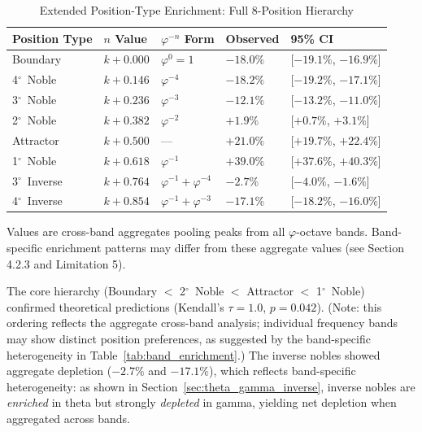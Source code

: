 \documentclass[11pt,a4paper]{article}
\newcommand{\degree}{$^\circ$}  %
\newcommand{\phisym}{\varphi}
\begin{document}
\begin{table}[H]
\centering
\caption{Extended Position-Type Enrichment: Full 8-Position Hierarchy}
\label{tab:enrichment_results}
\begin{tabular}{@{}lllll@{}}
\toprule
Position Type & $n$ Value & $\phisym^{-n}$ Form & Observed & 95\% CI \\
\midrule
Boundary & $k + 0.000$ & $\phisym^0 = 1$ & $-18.0\%$ & [$-19.1\%$, $-16.9\%$] \\
4\degree\ Noble & $k + 0.146$ & $\phisym^{-4}$ & $-18.2\%$ & [$-19.2\%$, $-17.1\%$] \\
3\degree\ Noble & $k + 0.236$ & $\phisym^{-3}$ & $-12.1\%$ & [$-13.2\%$, $-11.0\%$] \\
2\degree\ Noble & $k + 0.382$ & $\phisym^{-2}$ & $+1.9\%$ & [$+0.7\%$, $+3.1\%$] \\
Attractor & $k + 0.500$ & --- & $+21.0\%$ & [$+19.7\%$, $+22.4\%$] \\
1\degree\ Noble & $k + 0.618$ & $\phisym^{-1}$ & $+39.0\%$ & [$+37.6\%$, $+40.3\%$] \\
3\degree\ Inverse & $k + 0.764$ & $\phisym^{-1} + \phisym^{-4}$ & $-2.7\%$ & [$-4.0\%$, $-1.6\%$] \\
4\degree\ Inverse & $k + 0.854$ & $\phisym^{-1} + \phisym^{-3}$ & $-17.1\%$ & [$-18.2\%$, $-16.0\%$] \\
\bottomrule
\end{tabular}
\begin{tablenotes}
\small
\item Values are cross-band aggregates pooling peaks from all $\phisym$-octave bands. Band-specific enrichment patterns may differ from these aggregate values (see Section 4.2.3 and Limitation 5).
\end{tablenotes}
\end{table}

The core hierarchy (Boundary $<$ 2\degree\ Noble $<$ Attractor $<$ 1\degree\ Noble) confirmed theoretical predictions (Kendall's $\tau = 1.0$, $p = 0.042$). (Note: this ordering reflects the aggregate cross-band analysis; individual frequency bands may show distinct position preferences, as suggested by the band-specific heterogeneity in Table~\ref{tab:band_enrichment}.) The inverse nobles showed aggregate depletion ($-2.7\%$ and $-17.1\%$), which reflects band-specific heterogeneity: as shown in Section~\ref{sec:theta_gamma_inverse}, inverse nobles are \textit{enriched} in theta but strongly \textit{depleted} in gamma, yielding net depletion when aggregated across bands.
\end{document}
